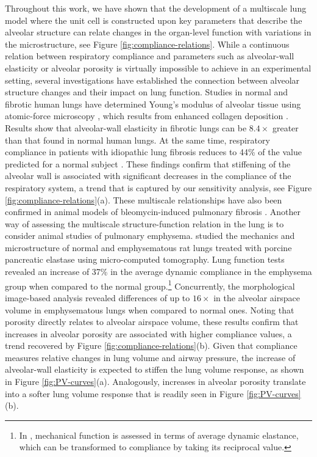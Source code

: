 \documentclass[preprint,3p,12pt,number,sort&compress]{elsarticle}
\begin{document}
Throughout this work, we have shown that the development of a multiscale lung model where the unit cell is constructed upon key parameters that describe the alveolar structure can relate changes in the organ-level function with variations in the microstructure, see Figure \ref{fig:compliance-relations}. While a continuous relation between respiratory compliance and parameters such as alveolar-wall elasticity or alveolar porosity is virtually impossible to achieve in an experimental setting, several investigations have established the connection between alveolar structure changes and their impact on lung function. Studies in normal and fibrotic human lungs have determined Young's modulus of alveolar tissue using atomic-force microscopy \cite{booth2012acellular}, which results from enhanced collagen deposition \cite{snijder2019pulmonary,hinz2012mechanical}. Results show that alveolar-wall elasticity in fibrotic lungs can be $8.4 \times$ greater than that found in normal human lungs. At the same time, respiratory compliance in patients with idiopathic lung fibrosis reduces to 44\% of the value predicted for a normal subject \cite{PlantierEtal2018}. These findings confirm that stiffening of the alveolar wall is associated with significant decreases in the compliance of the respiratory system, a trend that is captured by our sensitivity analysis, see Figure \ref{fig:compliance-relations}(a). These multiscale relationships have also been confirmed in animal models of bleomycin-induced pulmonary fibrosis \cite{DolhnikoffEtal1999}. Another way of assessing the multiscale structure-function relation in the lung is to consider animal studies of pulmonary emphysema. \citet{Parameswaran2009} studied the mechanics and microstructure of normal and emphysematous rat lungs treated with porcine pancreatic elastase using micro-computed tomography. Lung function tests revealed an increase of 37\% in the average dynamic compliance in the emphysema group when compared to the normal group.\footnote{In \cite{Parameswaran2009}, mechanical function is assessed in terms of average dynamic elastance, which can be transformed to compliance by taking its reciprocal value.} Concurrently, the morphological image-based analysis revealed differences of up to $16\times$ in the alveolar airspace volume in emphysematous lungs when compared to normal ones. Noting that porosity directly relates to alveolar airspace volume, these results confirm that increases in alveolar porosity are associated with higher compliance values, a trend recovered by Figure \ref{fig:compliance-relations}(b). Given that compliance measures relative changes in lung volume and airway pressure, the increase of alveolar-wall elasticity is expected to stiffen the lung volume response, as shown in Figure \ref{fig:PV-curves}(a). Analogously, increases in alveolar porosity translate into a softer lung volume response that is readily seen in Figure \ref{fig:PV-curves}(b).\\
\end{document}
